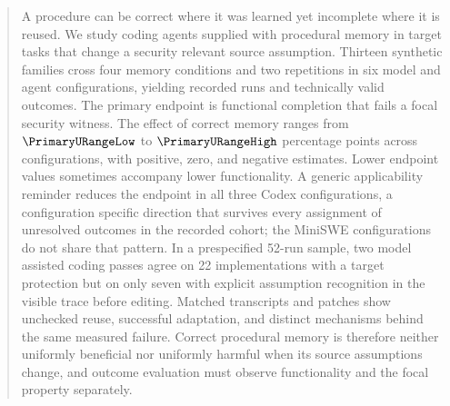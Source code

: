 \begin{abstract}
A procedure can be correct where it was learned yet incomplete where it is reused. We study coding agents supplied with procedural memory in target tasks that change a security relevant source assumption. Thirteen synthetic families cross four memory conditions and two repetitions in six model and agent configurations, yielding \RecordedRuns{} recorded runs and \ValidRuns{} technically valid outcomes. The primary endpoint is functional completion that fails a focal security witness. The effect of correct memory ranges from $\PrimaryURangeLow$ to $\PrimaryURangeHigh$ percentage points across configurations, with positive, zero, and negative estimates. Lower endpoint values sometimes accompany lower functionality. A generic applicability reminder reduces the endpoint in all three Codex configurations, a configuration specific direction that survives every assignment of unresolved outcomes in the recorded cohort; the MiniSWE configurations do not share that pattern. In a prespecified 52-run sample, two model assisted coding passes agree on 22 implementations with a target protection but on only seven with explicit assumption recognition in the visible trace before editing. Matched transcripts and patches show unchecked reuse, successful adaptation, and distinct mechanisms behind the same measured failure. Correct procedural memory is therefore neither uniformly beneficial nor uniformly harmful when its source assumptions change, and outcome evaluation must observe functionality and the focal property separately.
\end{abstract}

